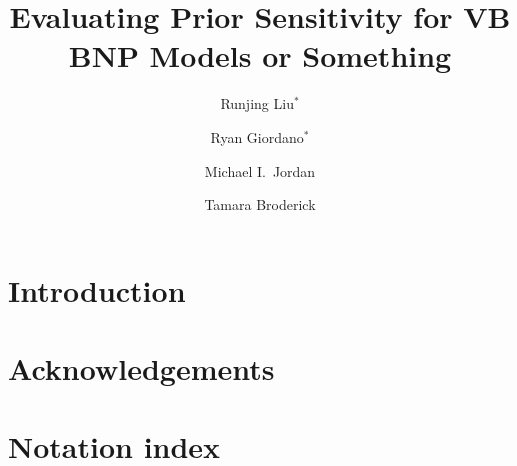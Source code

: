 \documentclass{article}
\title{Evaluating Prior Sensitivity for VB BNP Models or Something}
\author{
  Runjing Liu$^*$%
  \and
  Ryan Giordano$^*$ %
  \and
  Michael I.~Jordan %
  \and
  Tamara Broderick %
}
\begin{document}


\maketitle

\begin{abstract}
%

%
\end{abstract}

\section{Introduction}\label{sec:introduction}


\newpage

\section{Acknowledgements}\label{sec:ack}





\newpage
\onecolumn
\appendix

\section{Notation index}

\newpage
\end{document}
